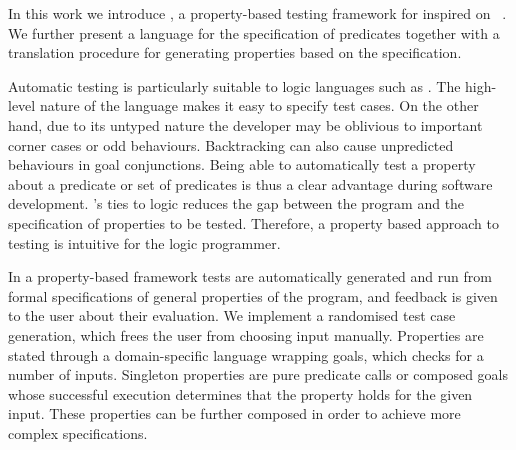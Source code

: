In this work we introduce \plqc{}, a
property-based testing framework for \Prolog{} inspired on
 \QuickCheck~\cite{quickcheck}.
%
We further present a language for the specification of \Prolog{} predicates
together with a translation procedure for generating \plqc{} properties
based on the specification.


Automatic testing is particularly suitable to logic languages such as
\Prolog{}. The high-level nature of the language makes it easy to
specify test cases.
%
On the other hand, due to its untyped nature the developer may be
oblivious to important corner cases or odd behaviours.
%
Backtracking can also cause unpredicted behaviours in goal conjunctions.
%
Being able to automatically test a property about a predicate or set of
predicates is thus a clear advantage during software development.
%
\Prolog{}'s ties to logic reduces the gap between the program and the
specification of properties to be tested.
%
Therefore, a property based approach to testing is intuitive for the
logic programmer.


In a property-based framework tests are automatically generated and run from formal specifications of general
properties of the program, and feedback is given to the user about their
evaluation.
%
We implement a randomised test case generation, which frees the user
from choosing input manually.
%
Properties are stated through a domain-specific language wrapping
\Prolog{} goals, which \plqc{} checks for a number of inputs.
%
Singleton properties are pure predicate calls
or composed goals whose successful execution determines that the
property holds for the given input.
%
These properties can be further composed in order to achieve more complex
specifications.




